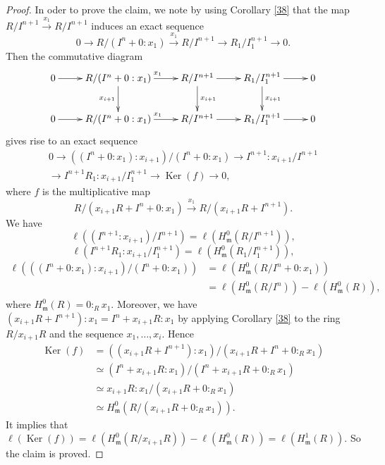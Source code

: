 \documentclass{amsart}
\theoremstyle {definition}
\theoremstyle {remark}
\begin{document}
\begin{proof}
In oder to prove the claim, we note by using Corollary \ref{38} that the map $R/I^{n+1}\stackrel{x_1}{\longrightarrow}R/I^{n+1}$ induces an exact sequence
$$0\longrightarrow R/(I^{n}+0:x_1) \stackrel{x_1}{\longrightarrow}R/I^{n+1}\longrightarrow R_1/I_1^{n+1}\longrightarrow 0.$$
Then the commutative diagram
\begin{displaymath}
\xymatrix{
0\ar[r]&R/(I^n+0:x_1)  \ar[r]^{x_1} \ar[d]_{x_{i+1}} &
R/I^{n+1}\ar[d]^{x_{i+1}}\ar[r]&R_1/I_1^{n+1}\ar[d]^{x_{i+1}}\ar[r]&0\\ 0\ar[r]& R/(I^n+0:x_1) \ar[r]^{x_1} & R/I^{n+1}\ar[r]&R_1/I_1^{n+1}\ar[r]&0}
\end{displaymath}
gives rise to an exact sequence
\begin{multline*}
0\longrightarrow  ((I^n+0:x_1):x_{i+1})/(I^n+0:x_1)\longrightarrow  I^{n+1}:x_{i+1}/I^{n+1}\\
\longrightarrow I^{n+1}R_1:x_{i+1}/ I_1^{n+1}
\longrightarrow {\operatorname{Ker}}(f)\longrightarrow  0,
\end{multline*}
where $f$ is the multiplicative map
$$R/(x_{i+1}R+ I^n+0:x_1)\stackrel{x_1}{\longrightarrow}R/(x_{i+1}R+I^{n+1}).$$
We have
$$\ell((I^{n+1}:x_{i+1})/I^{n+1})=\ell(H^0_{\ensuremath{\mathfrak m}}(R/I^{n+1})),$$
$$\ell(I^{n+1}R_1:x_{i+1}/I_1^{n+1})=\ell(H^0_{\ensuremath{\mathfrak m}}(R_1/I_1^{n+1})),$$
\[\begin{aligned}
\ell(((I^n+0:x_1):x_{i+1})/(I^n+0:x_1))
&=\ell(H^0_{\ensuremath{\mathfrak m}}(R/I^n+0:x_1))\\
&=\ell(H^0_{\ensuremath{\mathfrak m}}(R/I^n))-\ell(H^0_{\ensuremath{\mathfrak m}}(R)),
\end{aligned}\]
where $H^0_{\ensuremath{\mathfrak m}}(R)=0:_Rx_1$. Moreover, we have $(x_{i+1}R+I^{n+1}):x_1=I^n+x_{i+1}R:x_1$ by applying Corollary \ref{38} to the ring $R/x_{i+1}R$ and the sequence $x_1, \ldots, x_i$. Hence
\[\begin{aligned}
{\operatorname{Ker}}(f)&=((x_{i+1}R+I^{n+1}):x_1)/(x_{i+1}R+I^n+0:_Rx_1)\\
&\simeq (I^n+x_{i+1}R:x_1)/(I^n+x_{i+1}R+0:_Rx_1)\\
&\simeq x_{i+1}R:x_1/(x_{i+1}R+0:_Rx_1)\\
&\simeq H^0_{\ensuremath{\mathfrak m}}(R/(x_{i+1}R+0:_Rx_1)).
\end{aligned}\]
It implies that $\ell({\operatorname{Ker}}(f))=\ell(H^0_{\ensuremath{\mathfrak m}}(R/x_{i+1}R))-\ell(H^0_{\ensuremath{\mathfrak m}}(R))=\ell(H^1_{\ensuremath{\mathfrak m}}(R))$. So the claim is proved.
\medskip


\end{proof}
\end{document}
